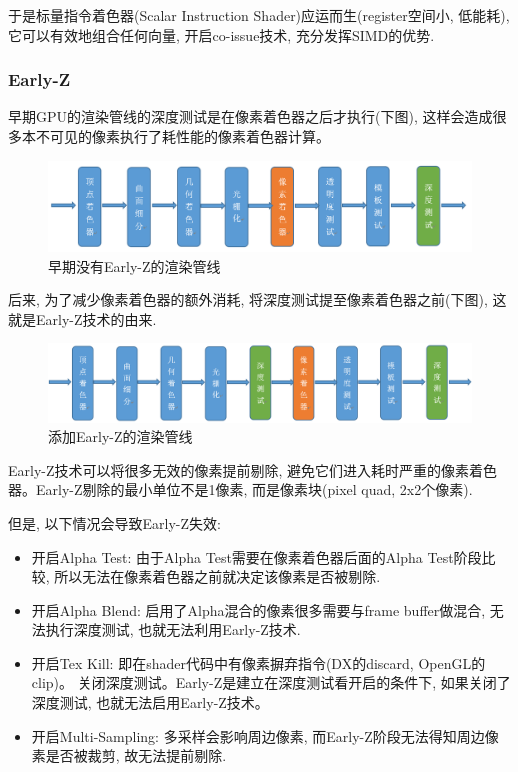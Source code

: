 \documentclass[UTF8]{ctexart}
\begin{document}
于是标量指令着色器(Scalar Instruction Shader)应运而生(register空间小, 低能耗), 它可以有效地组合任何向量, 开启co-issue技术, 充分发挥SIMD的优势.

\subsubsection{Early-Z}
早期GPU的渲染管线的深度测试是在像素着色器之后才执行(下图), 这样会造成很多本不可见的像素执行了耗性能的像素着色器计算。

\begin{figure}[H]
  \includegraphics[width=15cm]{early_z.png}
  \centering
  \caption{早期没有Early-Z的渲染管线}
  \label{fig:rendering-pipeline-without-early-z}
\end{figure}

后来, 为了减少像素着色器的额外消耗, 将深度测试提至像素着色器之前(下图), 这就是Early-Z技术的由来.
\begin{figure}[H]
  \includegraphics[width=15cm]{early_z_1.png}
  \centering
  \caption{添加Early-Z的渲染管线}
  \label{fig:rendering-pipeline-with-early-z}
\end{figure}

Early-Z技术可以将很多无效的像素提前剔除, 避免它们进入耗时严重的像素着色器。Early-Z剔除的最小单位不是1像素, 而是像素块(pixel quad, 2x2个像素).

  但是, 以下情况会导致Early-Z失效:
  \begin{itemize}
  \item 开启Alpha Test: 由于Alpha Test需要在像素着色器后面的Alpha Test阶段比较, 所以无法在像素着色器之前就决定该像素是否被剔除.

  \item 开启Alpha Blend: 启用了Alpha混合的像素很多需要与frame buffer做混合, 无法执行深度测试, 也就无法利用Early-Z技术.

  \item 开启Tex Kill: 即在shader代码中有像素摒弃指令(DX的discard, OpenGL的clip)。
  关闭深度测试。Early-Z是建立在深度测试看开启的条件下, 如果关闭了深度测试, 也就无法启用Early-Z技术。

  \item 开启Multi-Sampling: 多采样会影响周边像素, 而Early-Z阶段无法得知周边像素是否被裁剪, 故无法提前剔除.

  \end{itemize}
\end{document}

